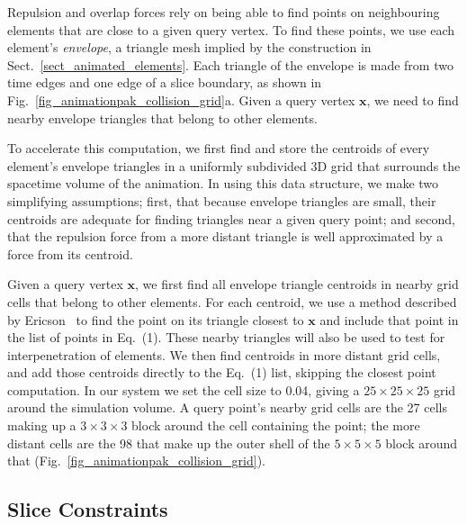 Repulsion and overlap forces rely on being able to find points on
neighbouring elements that are close to a given query vertex.
To find these points, we use each element's
\textit{envelope}, a triangle mesh implied by the construction in
Sect.~\ref{sect_animated_elements}.  Each triangle of the envelope 
is made from two time edges and one edge of a slice boundary, as
shown in Fig.~\ref{fig_animationpak_collision_grid}a.  Given a query vertex 
$\bm{x}$, we need to find nearby envelope triangles that belong to
other elements.

To accelerate this computation, we first find and store the centroids of
every element's envelope triangles in a uniformly subdivided 3D grid that
surrounds the spacetime volume of the animation.  In using this data
structure, we make two simplifying assumptions; first, that because 
envelope triangles are small, their centroids
are adequate for finding triangles near a given query point; and second,
that the repulsion force from a more distant triangle is well approximated
by a force from its centroid.

Given a query vertex $\bm{x}$, we first find all envelope triangle
centroids in nearby grid cells that belong to other elements.  For each 
centroid, we use a method described by Ericson~\cite{Ericson2005} to
find the point on its triangle closest to $\bm{x}$ and
include that point in the list of points in Eq.~(1).  These
nearby triangles will also be used to test for interpenetration of elements.
We then find centroids in more distant grid cells, and add
those centroids directly to the Eq.~(1) list, skipping the closest point computation.
In our system we set the cell size to 0.04, giving a $25\times 25\times 25$
grid around the simulation volume.  A query point's nearby grid cells 
are the 27 cells making up a $3\times 3\times 3$ block around the cell 
containing the point; the more distant cells are the 98 that make up the
outer shell of the $5\times 5\times 5$ block around that 
(Fig.~\ref{fig_animationpak_collision_grid}).


\subsection{Slice Constraints}
\label{animationpak_slice_constraints}

